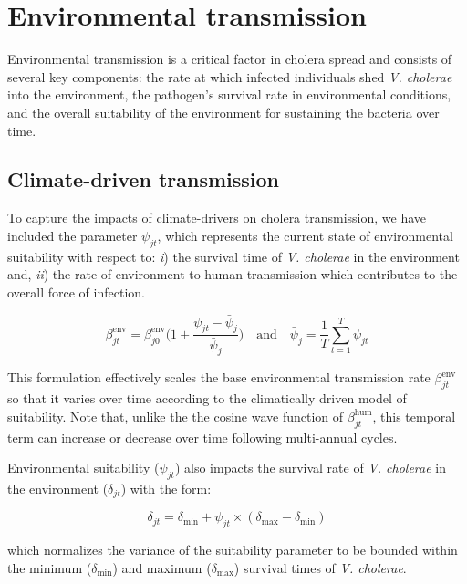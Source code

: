 \documentclass[
]{book}
\begin{document}
\section{Environmental transmission}\label{environmental-transmission}

Environmental transmission is a critical factor in cholera spread and consists of several key components: the rate at which infected individuals shed \emph{V. cholerae} into the environment, the pathogen's survival rate in environmental conditions, and the overall suitability of the environment for sustaining the bacteria over time.

\subsection{Climate-driven transmission}\label{climate-driven-transmission}

To capture the impacts of climate-drivers on cholera transmission, we have included the parameter \(\psi_{jt}\), which represents the current state of environmental suitability with respect to: \emph{i}) the survival time of \emph{V. cholerae} in the environment and, \emph{ii}) the rate of environment-to-human transmission which contributes to the overall force of infection.

\begin{equation}
\beta_{jt}^{\text{env}} = \beta_{j0}^{\text{env}} \Bigg(1 + \frac{\psi_{jt}-\bar\psi_j}{\bar\psi_j} \Bigg) \quad \text{and} \quad \bar\psi_j = \frac{1}{T} \sum_{t=1}^{T} \psi_{jt}
\label{eq:beta2}
\end{equation}

This formulation effectively scales the base environmental transmission rate \(\beta_{jt}^{\text{env}}\) so that it varies over time according to the climatically driven model of suitability. Note that, unlike the the cosine wave function of \(\beta_{jt}^{\text{hum}}\), this temporal term can increase or decrease over time following multi-annual cycles.

Environmental suitability (\(\psi_{jt}\)) also impacts the survival rate of \emph{V. cholerae} in the environment (\(\delta_{jt}\)) with the form:

\begin{equation}
\delta_{jt} = \delta_{\text{min}} + \psi_{jt} \times (\delta_{\text{max}} - \delta_{\text{min}})
\label{eq:delta}
\end{equation}

which normalizes the variance of the suitability parameter to be bounded within the minimum (\(\delta_{\text{min}}\)) and maximum (\(\delta_{\text{max}}\)) survival times of \emph{V. cholerae}.
\end{document}
